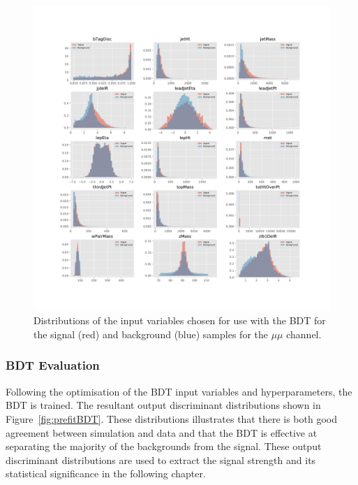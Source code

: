 \begin{figure}[htb]
\centering
\vspace*{-3.25cm}\hspace*{-2.3cm}\includegraphics[width=1.27\textwidth]{figs/background-estimation/plots/vars_mumu.pdf}
\vspace*{-1cm}\caption{
Distributions of the input variables chosen for use with the BDT for the signal (red) and background (blue) samples for the $\mu\mu$ channel.}
\label{fig:inputFeaturesDistributions_mumu}
\end{figure}

\subsubsection*{BDT Evaluation}
Following the optimisation of the BDT input variables and hyperparameters, the BDT is trained.
The resultant output discriminant distributions shown in Figure~\ref{fig:prefitBDT}.
These distributions illustrates that there is both good agreement between simulation and data and that the BDT is effective at separating the majority of the backgrounds from the signal.
These output discriminant distributions are used to extract the signal strength and its statistical significance in the following chapter.

